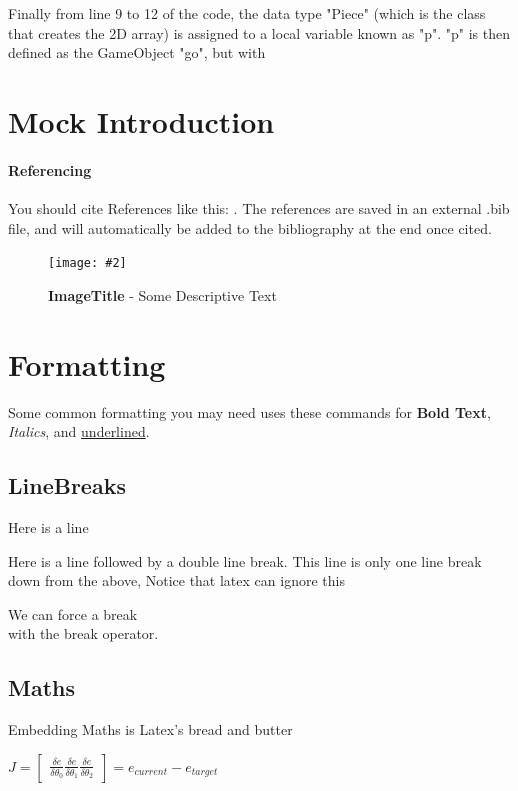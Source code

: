 \documentclass[10pt, a4paper]{article}
\newcommand{\figuremacro}[5]{
    \begin{figure}[#1]
        \centering
        \texttt{[image: \#2]}
        \caption[#3]{\textbf{#3}#4}
        \label{fig:#2}
    \end{figure}
}
\begin{document}
	 Finally from line 9 to 12 of the code, the data type "Piece" (which is the class that creates the 2D array) is assigned to a local variable known as "p". "p" is then defined as the GameObject "go", but with 
	 
	 
	
	
    \section{Mock Introduction}
    \paragraph{Referencing}
    You should cite References like this: \cite{Keshav}. The references are saved in an external .bib file, and will automatically be added to the bibliography at the end once cited.
    
    \figuremacro{h}{placeholder}{ImageTitle}{ - Some Descriptive Text}{1.0}
	
	\section{Formatting}
	Some common formatting you may need uses these commands for \textbf{Bold Text}, \textit{Italics}, and \underline{underlined}.
	\subsection{LineBreaks}
	Here is a line
    
    Here is a line followed by a double line break.
	This line is only one line break down from the above, Notice that latex can ignore this
    
    We can force a break \\ with the break operator.
    
	\subsection{Maths}
    Embedding Maths is Latex's bread and butter    
    
    {\centering \Large \(
        J = \begin{bmatrix}
            \frac{\delta e}{\delta \theta _0}
            \frac{\delta e}{\delta \theta _1}
            \frac{\delta e}{\delta \theta _2}
        \end{bmatrix}
        = e_{current} - e_{target} 
    \)\par}
	
\end{document}
